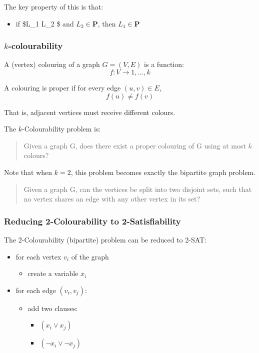 \documentclass[11pt]{article}
\providecommand{\tightlist}{%
      \setlength{\itemsep}{0pt}\setlength{\parskip}{0pt}}
\begin{document}
The key property of this is that:

\begin{itemize}
\tightlist
\item
  if \$L\_1 \leq L\_2 \$ and \(L_2 \in \mathbf{P}\), then
  \(L_1 \in \mathbf{P}\)
\end{itemize}

    \subsubsection{\texorpdfstring{\(k\)-colourability}{k-colourability}}\label{k-colourability}

A (vertex) colouring of a graph \(G = (V,E)\) is a function: \[
f: V \to {1, \ldots,k}
\]

A colouring is proper if for every edge \((u,v) \in E\), \[
f(u) \neq f(v)
\]

That is, adjacent vertices must receive different colours.

The \(k\)-Colourability problem is:

\begin{quote}
Given a graph G, does there exist a proper colouring of G using at most
\(k\) colours?
\end{quote}

Note that when \(k = 2\), this problem becomes exactly the bipartite
graph problem.

\begin{quote}
Given a graph G, can the vertices be split into two disjoint sets, such
that no vertex shares an edge with any other vertex in its set?
\end{quote}

\subsubsection{Reducing 2-Colourability to
2-Satisfiability}\label{reducing-2-colourability-to-2-satisfiability}

The 2-Colourability (bipartite) problem can be reduced to 2-SAT:

\begin{itemize}
\tightlist
\item
  for each vertex \(v_i\) of the graph

  \begin{itemize}
  \tightlist
  \item
    create a variable \(x_i\)
  \end{itemize}
\item
  for each edge \((v_i, v_j)\):

  \begin{itemize}
  \tightlist
  \item
    add two clauses:

    \begin{itemize}
    \tightlist
    \item
      \((x_i \lor x_j)\)
    \item
      \((\neg x_i \lor \neg x_j)\)
    \end{itemize}
  \end{itemize}
\end{itemize}
\end{document}
